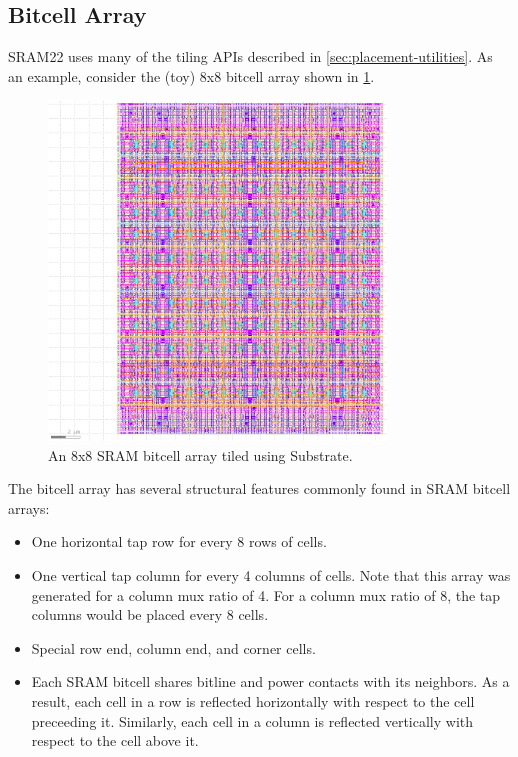 \subsection{Bitcell Array} \label{sec:bitcell-array-layout}

SRAM22 uses many of the tiling APIs described in \ref{sec:placement-utilities}.
As an example, consider the (toy) 8x8 bitcell array shown in \ref{fig:bitcell8x8}.

\begin{figure}[H] \centering
\includegraphics[width=0.8\textwidth]{figures/bitcell8x8.png}
\caption{An 8x8 SRAM bitcell array tiled using Substrate. \label{fig:bitcell8x8}}
\end{figure}

The bitcell array has several structural features commonly found in SRAM bitcell arrays:
\begin{itemize}
\item One horizontal tap row for every 8 rows of cells.
\item One vertical tap column for every 4 columns of cells. Note that this array was
  generated for a column mux ratio of 4. For a column mux ratio of 8, the tap columns
  would be placed every 8 cells.
\item Special row end, column end, and corner cells.
\item Each SRAM bitcell shares bitline and power contacts with its neighbors.
  As a result, each cell in a row is reflected horizontally with respect to the cell preceeding it.
  Similarly, each cell in a column is reflected vertically with respect to the cell above it.
\end{itemize}

